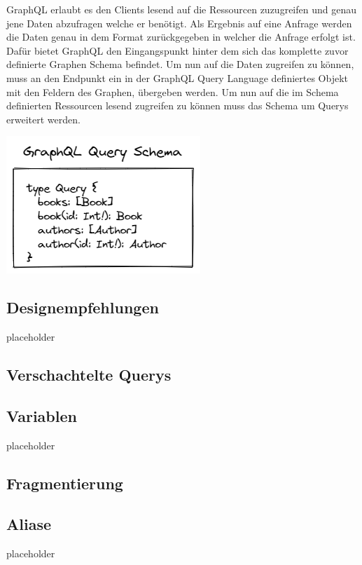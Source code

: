 \documentclass[bachelor, german ]{hgbthesis}
\begin{document}
GraphQL erlaubt es den Clients lesend auf die Ressourcen zuzugreifen und genau jene Daten abzufragen welche er benötigt.
Als Ergebnis auf eine Anfrage werden die Daten genau in dem Format zurückgegeben in welcher die Anfrage erfolgt ist.
Dafür bietet GraphQL den Eingangspunkt hinter dem sich das komplette zuvor definierte Graphen Schema befindet.
Um nun auf die Daten zugreifen zu können, muss an den Endpunkt ein in der GraphQL Query Language definiertes Objekt mit den Feldern des Graphen, übergeben werden.
Um nun auf die im Schema definierten Ressourcen lesend zugreifen zu können muss das Schema um Querys erweitert werden. 

\includegraphics{pics/GraphQL_Query_Schema.png}

\subsection{Designempfehlungen}

placeholder
\pagebreak

\subsection{Verschachtelte Querys}

\subsection{Variablen}

placeholder
\pagebreak

\subsection{Fragmentierung}

\subsection{Aliase}

placeholder
\pagebreak
\end{document}
